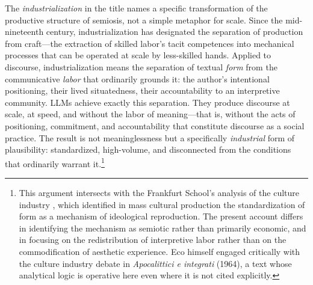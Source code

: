 \documentclass[12pt,a4paper]{article}
\begin{document}
The \emph{industrialization} in the title names a specific transformation of
the productive structure of semiosis, not a simple metaphor for scale. Since
the mid-nineteenth century, industrialization has designated the separation
of production from craft---the extraction of skilled labor's tacit competences
into mechanical processes that can be operated at scale by less-skilled hands.
Applied to discourse, industrialization means the separation of textual
\emph{form} from the communicative \emph{labor} that ordinarily grounds it:
the author's intentional positioning, their lived situatedness, their
accountability to an interpretive community. LLMs achieve exactly this
separation. They produce discourse at scale, at speed, and without the
labor of meaning---that is, without the acts of positioning, commitment,
and accountability that constitute discourse as a social practice. The result
is not meaninglessness but a specifically \emph{industrial} form of plausibility:
standardized, high-volume, and disconnected from the conditions that ordinarily
warrant it.\footnote{This argument intersects with the Frankfurt School's
analysis of the culture industry \citep{AdornoHorkheimer1944}, which identified
in mass cultural production the standardization of form as a mechanism of
ideological reproduction. The present account differs in identifying the
mechanism as semiotic rather than primarily economic, and in focusing on
the redistribution of interpretive labor rather than on the commodification
of aesthetic experience. Eco himself engaged critically with the culture
industry debate in \emph{Apocalittici e integrati} (1964), a text whose
analytical logic is operative here even where it is not cited explicitly.}
\end{document}
